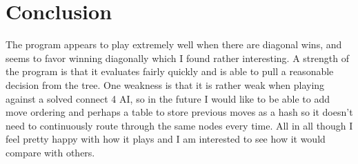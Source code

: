 \documentclass[11pt,letterpaper]{article}
\begin{document}
\section{Conclusion}
The program appears to play extremely well when there are diagonal wins, and seems to favor winning diagonally which I found rather interesting.
A strength of the program is that it evaluates fairly quickly and is able to pull a reasonable decision from the tree. One weakness is that it is rather weak when playing against a solved connect 4 AI, so in the future I would like to be able to add move ordering and perhaps a table to store previous moves as a hash so it doesn't need to continuously route through the same nodes every time. All in all though I feel pretty happy with how it plays and I am interested to see how it would compare with others.

\end{document}

